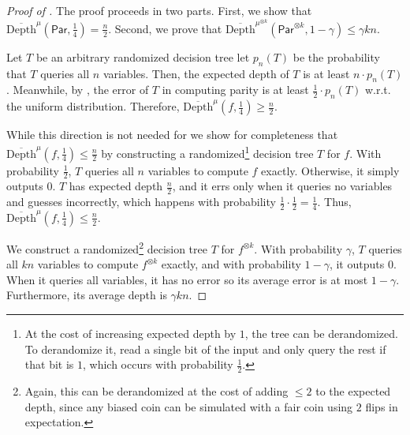 \begin{proof}[Proof of ]
The proof proceeds in two parts. First, we show that $\overline{\text{Depth}}^\mu(\mathsf{Par}, \tfrac{1}{4})= \frac{n}{2}$. Second, we prove that  $\overline{\text{Depth}}^{\mu^{\otimes k}}(\mathsf{Par}^{\otimes k}, 1 -\gamma) \leq \gamma k n$.

 Let $T$ be an arbitrary randomized decision tree let $p_n(T)$ be the probability that $T$ queries all $n$ variables. Then, the expected depth of $T$ is at least $n \cdot p_n(T)$. Meanwhile, by , the error of $T$ in computing parity is at least $\frac1{2} \cdot p_n(T)$ w.r.t. the uniform distribution. Therefore, $\overline{\text{Depth}}^\mu(f, \frac1{4}) \geq \frac{n}{2}$.

While this direction is not needed for  we show for completeness that $\overline{\text{Depth}}^\mu(f, \frac1{4}) \leq \frac{n}{2}$ by constructing a randomized\footnote{At the cost of increasing expected depth by $1$, the tree can be derandomized. To derandomize it, read a single bit of the input and only query the rest if that bit is $1$, which occurs with probability $\tfrac{1}{2}$.} decision tree $T$ for $f$.
 With probability $\frac1{2}$, $T$ queries all $n$ variables to compute $f$ exactly. Otherwise, it simply outputs $0$. $T$ has expected depth $\frac{n}{2}$, and it errs only when it queries no variables and guesses incorrectly, which happens with probability $\frac1{2}\cdot \frac1{2}= \frac1{4}$. Thus, $\overline{\text{Depth}}^\mu(f, \frac1{4}) \leq \frac{n}{2}$. 




 We construct a randomized\footnote{Again, this can be derandomized at the cost of adding 
$\leq 2$ to the expected depth, since any biased coin can be simulated with a fair coin using $2$ flips in expectation.} decision tree $T$ for $f^{\otimes k}$. With probability $\gamma$, $T$ queries all $kn$ variables to compute $f^{\otimes k}$ exactly, and with probability $1-\gamma$, it outputs 0. When it queries all variables, it has no error so its average error is at most $1 - \gamma$. Furthermore, its average depth is $\gamma k n$.
\end{proof}